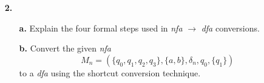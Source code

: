 \documentclass[ 12pt ]{article}
\begin{document}
\begin{enumerate}
\begin{proof}
			Let us now compute $L(r_1)$ and $L(r_2)$. Since $r_1$ and $r_2$ are regular expressions, we can apply Definition 3.2. Then it follows that
			\begin{align*}
				L(r_1) &= L( (ab^* + c)(\lambda + \emptyset) ) \\
				&= L(ab^* + c) L(\lambda + \emptyset) \\
				&= ( L(ab^*) \cup L(c) ) ( L(\lambda) \cup L(\emptyset) ) \\
				&= ( L(a)L(b^*) \cup \{ c \} ) ( \{ \lambda \} \cup \emptyset ) \\
				&= ( \{ a \} L(b)^* \cup \{ c \} ) \{ \lambda \} \\
				&= ( \{ a \} \{ b \}^* \cup \{ c \} ) \{ \lambda \} \\
				&= ( \{ a, ab, abb, \hdots \} \cup \{ c \} ) \{ \lambda \} \\
				&= \{ c, a, ab, abb, \hdots \} \{ \lambda \} \\
				L(r_1) &= \{ c, a, ab, abb, \hdots \}
			\end{align*}
			and also,
			\begin{align*}
				L(r_2) &= L( (a + c)(b^* + \emptyset) ) \\
				&= L(a + c) L(b^* + \emptyset) \\
				&= ( L(a) \cup L(c) ) ( L(b^*) \cup L(\emptyset) ) \\
				&= ( \{ a \} \cup \{ c \} ) ( L(b)^* \cup \emptyset ) \\
				&= \{ a, c \} ( \{ b \}^* \cup \emptyset ) \\
				&= \{ a, c \} \{ b \}^* \\
				L(r_2) &= \{ a, ab, abb, \hdots, c, cb, cbb, \hdots \}.
			\end{align*}
			Now we can clearly see that $cb$, as well as $cbb$, $cbbb$, $\hdots$ all belong to $L(r_2)$ but not $L(r_1)$.
		\end{proof}
		\newpage


	\item[\textbf{2.}]
		\begin{enumerate}
			\item[\textbf{a.}] Explain the four formal steps used in \textit{nfa} $\to$ \textit{dfa} conversions.
			\item[\textbf{b.}] Convert the given \textit{nfa} $$M_n = (\{q_0, q_1, q_2, q_3\}, \{a, b\}, \delta_n, q_0, \{q_1\})$$
				to a \textit{dfa} using the shortcut conversion technique.
		\end{enumerate}


\end{enumerate}
\end{document}
